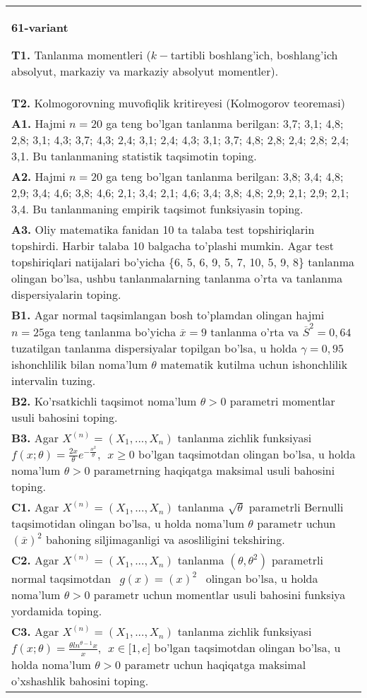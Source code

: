 \documentclass{article}
\begin{document}
\begin{tabular}{m{17cm}}
\textbf{61-variant}
\newline

\textbf{T1.} 
Tanlanma momentleri (\(k -\)tartibli boshlang'ich, boshlang'ich absolyut, markaziy va markaziy absolyut momentler).
\\
\textbf{T2.} 
Kolmogorovning muvofiqlik kritireyesi (Kolmogorov teoremasi)
\\
\textbf{A1.} 
Hajmi \(n = 20\) ga teng bo'lgan tanlanma berilgan: 3,7; 3,1; 4,8; 2,8; 3,1; 4,3; 3,7; 4,3; 2,4; 3,1; 2,4; 4,3; 3,1; 3,7; 4,8; 2,8; 2,4; 2,8; 2,4; 3,1. Bu tanlanmaning statistik taqsimotin toping.
\\
\textbf{A2.} 
Hajmi \(n = 20\) ga teng bo'lgan tanlanma berilgan: 3,8; 3,4; 4,8; 2,9; 3,4; 4,6; 3,8; 4,6; 2,1; 3,4; 2,1; 4,6; 3,4; 3,8; 4,8; 2,9; 2,1; 2,9; 2,1; 3,4. Bu tanlanmaning empirik taqsimot funksiyasin toping.
\\
\textbf{A3.} 
Oliy matematika fanidan 10 ta talaba test topshiriqlarin topshirdi. Harbir talaba 10 balgacha to'plashi mumkin. Agar test topshiriqlari natijalari bo'yicha \{6, 5, 6, 9, 5, 7, 10, 5, 9, 8\} tanlanma olingan bo'lsa, ushbu tanlanmalarning tanlanma o'rta va tanlanma dispersiyalarin toping.
\\
\textbf{B1.} 
Agar normal taqsimlangan bosh to'plamdan olingan hajmi \(n = 25\)ga teng tanlanma bo'yicha \(\overline{x} = 9\) tanlanma o'rta va \({\overline{S}}^{2} = 0,64\) tuzatilgan tanlanma dispersiyalar topilgan bo'lsa, u holda \(\gamma = 0,95\) ishonchlilik bilan noma'lum \(\theta\) matematik kutilma uchun ishonchlilik intervalin tuzing.
\\
\textbf{B2.} 
Ko'rsatkichli taqsimot noma'lum \(\theta > 0\) parametri momentlar usuli bahosini toping.
\\
\textbf{B3.} 
Agar \(X^{(n)} = \left( X_{1},...,X_{n} \right)\) tanlanma zichlik funksiyasi \(f(x;\theta) = \frac{2x}{\theta}e^{- \frac{x^{2}}{\theta}},\ \ x \geq 0\) bo'lgan taqsimotdan olingan bo'lsa, u holda noma'lum \(\theta > 0\) parametrning haqiqatga maksimal usuli bahosini toping.
\\
\textbf{C1.} 
Agar \(X^{(n)} = \left( X_{1},...,X_{n} \right)\) tanlanma \(\sqrt{\theta}\) parametrli Bernulli taqsimotidan olingan bo'lsa, u holda noma'lum \(\theta\) parametr uchun \((\overline{x})^{2}\) bahoning siljimaganligi va asosliligini tekshiring.
\\
\textbf{C2.} 
Agar \(X^{(n)} = \left( X_{1},...,X_{n} \right)\) tanlanma \((\theta,\theta^{2})\) parametrli normal taqsimotdan \(\ \ g(x) = (x)^{2}\ \ \) olingan bo'lsa, u holda noma'lum \(\theta > 0\) parametr uchun momentlar usuli bahosini funksiya yordamida toping.
\\
\textbf{C3.} 
Agar \(X^{(n)} = \left( X_{1},...,X_{n} \right)\) tanlanma zichlik funksiyasi \(f(x;\theta) = \frac{\theta ln^{\theta - 1}x}{x},\ \ x \in \lbrack 1,e\rbrack\) bo'lgan taqsimotdan olingan bo'lsa, u holda noma'lum \(\theta > 0\) parametr uchun haqiqatga maksimal o'xshashlik bahosini toping.
\\

\end{tabular}
\vspace{1cm}
\end{document}
